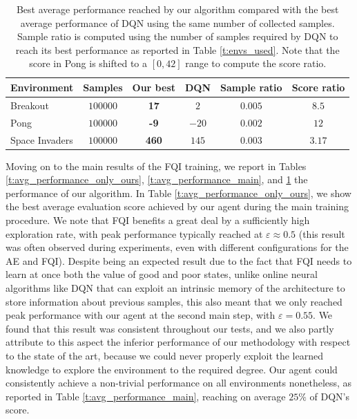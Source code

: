 \begin{table}
    \centering
    \begin{tabular}{l c c c c c} 
	\hline
	Environment    & Samples  & Our best      & DQN    & Sample ratio   & Score ratio \\
	\hline 
	Breakout       & $100000$ & \textbf{17}   & $2$    & $0.005$        & $8.5$\\
	Pong           & $100000$ & \textbf{-9}   & $-20$  & $0.002$        & $12$\\
	Space Invaders & $100000$ & \textbf{460}  & $145 $ & $0.003$        & $3.17$\\
	\hline
    \end{tabular}
    \caption[Sample efficiency of our algorithm]{Best average performance 
	    reached by our algorithm compared with the best average performance
	    of DQN using the same number of collected samples. 
	    Sample ratio is computed using the number of samples required by DQN
	    to reach its best performance as reported in Table \ref{t:envs_used}.
	    Note that the score in Pong is shifted to a $[0, 42]$ range to 
	    compute the score ratio.}
    \label{t:sample_efficiency_main}
\end{table}
%

Moving on to the main results of the FQI training, we report in Tables 
\ref{t:avg_performance_only_ours}, \ref{t:avg_performance_main}, and 
\ref{t:sample_efficiency_main} the performance of our algorithm.
In Table \ref{t:avg_performance_only_ours}, we show the best average evaluation 
score achieved by our agent during the main training procedure.
We note that FQI benefits a great deal by a sufficiently high exploration rate, 
with peak performance typically reached at $\varepsilon\approx0.5$ (this result 
was often observed during experiments, even with different configurations for 
the AE and FQI). 
Despite being an expected result due to the fact that FQI needs to learn at
once both the value of good and poor states, unlike online neural algorithms 
like DQN that can exploit an intrinsic memory of the architecture to store 
information about previous samples, this also meant that we only reached peak 
performance with our agent at the second main step, with $\varepsilon = 0.55$.
We found that this result was consistent throughout our tests, and we also 
partly attribute to this aspect the inferior performance of our methodology with
respect to the state of the art, because we could never properly exploit the 
learned knowledge to explore the environment to the required degree.
Our agent could consistently achieve a non-trivial performance on all
environments nonetheless, as reported in Table \ref{t:avg_performance_main}, 
reaching on average $25\%$ of DQN's score.

